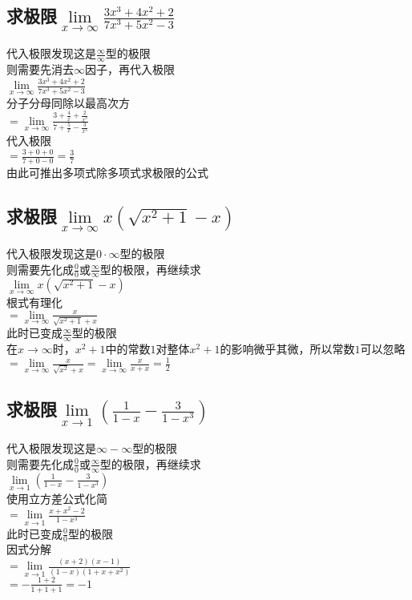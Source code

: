 \documentclass{article}
\begin{document}
\begin{flushleft}
\subsection{
求极限$\lim\limits_{x\to \infty}\frac{3x^3+4x^2+2}{7x^3+5x^2-3}$
}
代入极限发现这是$\frac{\infty}{\infty}$型的极限\\
则需要先消去$\infty$因子，再代入极限\\
$\lim\limits_{x\to \infty}\frac{3x^3+4x^2+2}{7x^3+5x^2-3}$\\
分子分母同除以最高次方\\
$=\lim\limits_{x\to \infty}\frac{3+\frac{4}{x}+\frac{2}{x^3}}{7+\frac{5}{x}-\frac{3}{x^3}}$\\
代入极限\\
$=\frac{3+0+0}{7+0-0}=\frac{3}{7}$\\
由此可推出多项式除多项式求极限的公式\\

\subsection{
求极限$\lim\limits_{x\to \infty}x(\sqrt{x^2+1}-x)$
}
代入极限发现这是$0\cdot\infty$型的极限\\
则需要先化成$\frac{0}{0}$或$\frac{\infty}{\infty}$型的极限，再继续求\\
$\lim\limits_{x\to \infty}x(\sqrt{x^2+1}-x)$\\
根式有理化\\
$=\lim\limits_{x\to \infty}\frac{x}{\sqrt{x^2+1}+x}$\\
此时已变成$\frac{\infty}{\infty}$型的极限\\
在$x\to\infty$时，$x^2+1$中的常数$1$对整体$x^2+1$的影响微乎其微，所以常数$1$可以忽略\\
$=\lim\limits_{x\to \infty}\frac{x}{\sqrt{x^2}+x}
=\lim\limits_{x\to \infty}\frac{x}{x+x}=\frac{1}{2}$\\

\subsection{
	求极限$\lim\limits_{x\to 1}(\frac{1}{1-x}-\frac{3}{1-x^3})$
}
代入极限发现这是$\infty-\infty$型的极限\\
则需要先化成$\frac{0}{0}$或$\frac{\infty}{\infty}$型的极限，再继续求\\
$\lim\limits_{x\to 1}(\frac{1}{1-x}-\frac{3}{1-x^3})$\\
使用立方差公式化简\\
$=\lim\limits_{x\to 1}\frac{x+x^2-2}{1-x^3}$\\
此时已变成$\frac{0}{0}$型的极限\\
因式分解\\
$=\lim\limits_{x\to 1}\frac{(x+2)(x-1)}{(1-x)(1+x+x^2)}$\\
$=-\frac{1+2}{1+1+1}=-1$\\


\end{flushleft}
\end{document}
